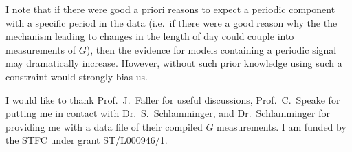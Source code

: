 \documentclass[comment]{epl2}
\begin{document}
I note that if there were good a priori reasons to expect a periodic component with a specific period in the data
(i.e.\ if there were a good reason why the the mechanism leading to changes in the length of day could couple into 
measurements of
$G$), then the evidence for models containing a periodic signal may dramatically increase. However, without such
prior knowledge using such a constraint would strongly bias us.


\acknowledgements

I would like to thank Prof.\ J.\ Faller for useful discussions, Prof.\ C.\ Speake for putting me in contact with
Dr.\ S.\ Schlamminger, and Dr.\ Schlamminger for providing me with a data file of their compiled $G$ measurements.
I am funded by the STFC under grant ST/L000946/1.



\end{document}
